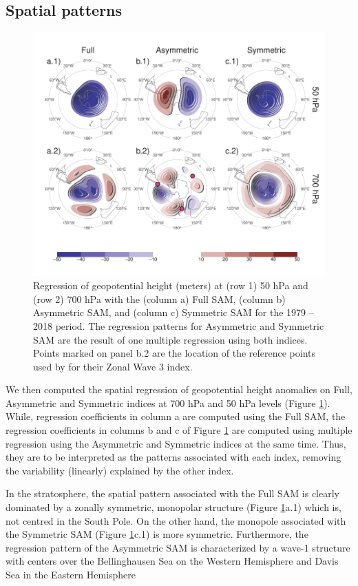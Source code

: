\documentclass[smallextended]{svjour3}       %
\begin{document}
\hypertarget{spatial}{%
\subsection{Spatial patterns}\label{spatial}}

\begin{figure}
\includegraphics{2d-regr-1} \caption{Regression of geopotential height (meters) at (row 1) 50 hPa and (row 2) 700 hPa with the (column a) Full SAM, (column b) Asymmetric SAM, and (column c) Symmetric SAM for the 1979 -- 2018 period. The regression patterns for Asymmetric and Symmetric SAM are the result of one multiple regression using both indices. Points marked on panel b.2 are the location of the reference points used by \cite{raphael2004} for their Zonal Wave 3 index. }\label{fig:2d-regr}
\end{figure}

We then computed the spatial regression of geopotential height anomalies on Full, Asymmetric and Symmetric indices at 700 hPa and 50 hPa levels (Figure \ref{fig:2d-regr}). While, regression coefficients in column a are computed using the Full SAM, the regression coefficients in columns b and c of Figure \ref{fig:2d-regr} are computed using multiple regression using the Asymmetric and Symmetric indices at the same time. Thus, they are to be interpreted as the patterns associated with each index, removing the variability (linearly) explained by the other index.

In the stratosphere, the spatial pattern associated with the Full SAM is clearly dominated by a zonally symmetric, monopolar structure (Figure \ref{fig:2d-regr}a.1) which is, not centred in the South Pole. On the other hand, the monopole associated with the Symmetric SAM (Figure \ref{fig:2d-regr}c.1) is more symmetric. Furthermore, the regression pattern of the Asymmetric SAM is characterized by a wave-1 structure with centers over the Bellinghausen Sea on the
Western Hemisphere and Davis Sea in the Eastern Hemisphere
\end{document}
